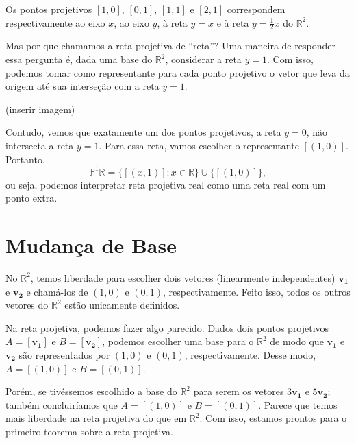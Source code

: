 \begin{exmp}
Os pontos projetivos $[1,0]$, $[0,1]$, $[1,1]$ e $[2,1]$ correspondem respectivamente ao eixo $x$, ao eixo $y$, à reta $y=x$ e à reta $y=\frac{1}{2}x$ do $\mathbb{R}^2$.
\end{exmp}

Mas por que chamamos a reta projetiva de ``reta''? Uma maneira de responder essa pergunta é, dada uma base do $\mathbb{R}^2$, considerar a reta $y=1$. Com isso, podemos tomar como representante para cada ponto projetivo o vetor que leva da origem até sua interseção  com a reta $y=1$.

(inserir imagem)

Contudo, vemos que exatamente um dos pontos projetivos, a reta \(y = 0\), não intersecta a reta \(y = 1\).
Para essa reta, vamos escolher o representante $[(1,0)]$.
Portanto, \[\mathbb{P}^1\mathbb{R} = \{ [(x,1)] : x \in \mathbb{R} \} \cup \{[(1,0)]\},\]
ou seja, podemos interpretar reta projetiva real como uma reta real com um ponto extra.

\section{Mudança de Base}

No \(\mathbb{R}^2\), temos liberdade para escolher dois vetores (linearmente independentes) \(\mathbf{v_1}\) e \(\mathbf{v_2}\) e chamá-los de \((1, 0)\) e \((0, 1)\), respectivamente.
Feito isso, todos os outros vetores do \(\mathbb{R}^2\) estão unicamente definidos.

Na reta projetiva, podemos fazer algo parecido. Dados dois pontos projetivos \(A = [\mathbf{v_1}]\) e \(B = [\mathbf{v_2}]\), podemos escolher uma base para o \(\mathbb{R}^2\) de modo que \(\mathbf{v_1}\) e \(\mathbf{v_2}\) são representados por \((1, 0)\) e \((0, 1)\), respectivamente.
Desse modo, \(A = [(1, 0)]\) e  \(B = [(0, 1)]\).

Porém, se tivéssemos escolhido a base do \(\mathbb{R}^2\) para serem os vetores \(3\mathbf{v_1}\) e  \(5\mathbf{v_2}\); também concluiríamos que \(A = [(1, 0)] \) e \(B = [(0, 1)]\). Parece que temos mais liberdade na reta projetiva do que em \(\mathbb{R}^2\). Com isso, estamos prontos para o primeiro teorema sobre a reta projetiva.

